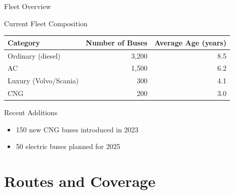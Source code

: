 \documentclass[aspectratio=169,11pt]{beamer}
\begin{document}
\begin{frame}{Fleet Overview}

  \begin{block}{Current Fleet Composition}

    \begin{tabular}{lrr}

      \toprule

      Category & Number of Buses & Average Age (years)\\

      \midrule

      Ordinary (diesel) & 3,200 & 8.5\\

      AC & 1,500 & 6.2\\

      Luxury (Volvo/Scania) & 300 & 4.1\\

      CNG & 200 & 3.0\\

      \bottomrule

    \end{tabular}

  \end{block}

  \begin{alertblock}{Recent Additions}

    \begin{itemize}

      \item 150 new CNG buses introduced in 2023

      \item 50 electric buses planned for 2025

    \end{itemize}

  \end{alertblock}

\end{frame}




\section{Routes and Coverage}
\end{document}
